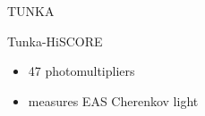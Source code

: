 \begin{frame}{TUNKA}
\begin{minipage}[t]{0.48\textwidth}
\begin{block}{Tunka-HiSCORE}
    \begin{itemize}
      \setlength{\itemsep}{0pt}
      \item 47 photomultipliers
      \item measures EAS Cherenkov light
    \end{itemize}
  \end{block}
\end{minipage}


\end{frame}